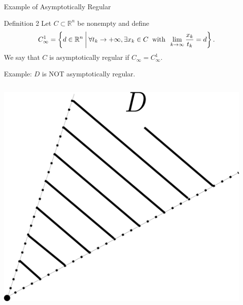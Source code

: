 \documentclass[aspectratio=169, dvipdfmx, 11pt]{beamer} %
\newcommand{\NDemenstionalRealEuclideanSpace}{\mathbb{R}^n}
\begin{document}
\begin{frame}{Example of Asymptotically Regular}
  \begin{block}{Definition 2}
    Let $C \subset \NDemenstionalRealEuclideanSpace$ be nonempty and define
    \begin{equation}
      C_{\infty}^1 = \left\{d \in \NDemenstionalRealEuclideanSpace \:\middle|\: \forall t_k \rightarrow + \infty , \exists x_k \in C \:\text{ with }\: \lim_{k \to \infty} \frac{x_k}{t_k} = d \right\}. \notag
    \end{equation}
    We say that $C$ is asymptotically regular if $C_{\infty} = C_{\infty}^1$.
  \end{block}

  Example: $D$ is NOT asymptotically regular.

  \centering
  \begin{columns}
    \begin{column}{0.48\textwidth}
    \centering
    \includegraphics[keepaspectratio, scale=0.085]{figures/example_not_asymptotically_regular_1.eps}
    \end{column}
    \pause
    \begin{column}{0.48\textwidth}
    \centering

\end{column}
\end{columns}
\end{frame}
\end{document}
